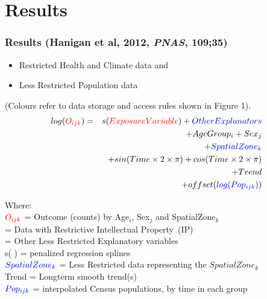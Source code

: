 \documentclass[bigger]{beamer}
\begin{document}
\section{Results}
\label{sec-3}
\begin{frame}
\frametitle{Results (Hanigan et al, 2012, \emph{PNAS}, 109;35)}
\label{sec-3-1}

\begin{footnotesize}
\begin{itemize}
\item {\color{red}Restricted Health and Climate data} and 
\item {\color{blue}Less Restricted Population data} 
\end{itemize}
(Colours refer to data storage and access rules shown in Figure 1).
\begin{eqnarray*}
        log({\color{red} O_{ijk}})  & = & s({\color{red}ExposureVariable})  + {\color{blue} OtherExplanators}  \\
        & &   + AgeGroup_{i} + Sex_{j} \\
        & &   + {\color{blue} SpatialZone_{k}}  \\
        & &  + sin(Time \times 2 \times \pi) + cos(Time \times 2 \times \pi) \\
        & &  + Trend \\
        & &   + offset({\color{blue} log(Pop_{ijk})})\\
\end{eqnarray*}
\end{footnotesize}
\begin{tiny}
\noindent Where:\\
        \indent ${\color{red}O_{ijk}}$ = Outcome (counts) by Age$_{i}$, Sex$_{j}$ and SpatialZone$_{k}$ \\
         = Data with {\color{red}Restrictive Intellectual Property~(IP)} \\
         = Other {\color{blue}Less Restricted}  Explanatory variables \\
        \indent s( ) = penalized regression splines \\
        \indent ${\color{blue} SpatialZone_{k}}$  = {\color{blue} Less Restricted} data representing the $SpatialZone_{k}$  \\
        \indent Trend = Longterm smooth trend(s) \\
        \indent ${\color{blue}Pop_{ijk}}$ = interpolated Census populations, by time in each group\\
\end{tiny}
\end{frame}
\end{document}
